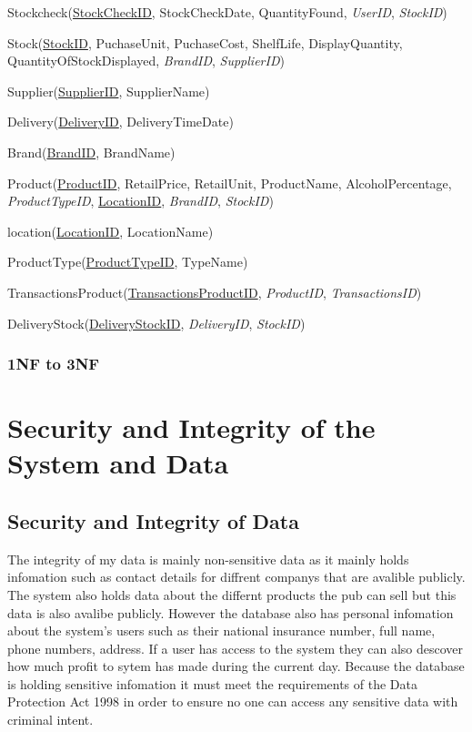 Stockcheck(\underline{StockCheckID}, StockCheckDate, QuantityFound, \emph{UserID}, \emph{StockID})

Stock(\underline{StockID}, PuchaseUnit, PuchaseCost, ShelfLife, DisplayQuantity, QuantityOfStockDisplayed, \emph{BrandID}, \emph{SupplierID})

Supplier(\underline{SupplierID}, SupplierName)

Delivery(\underline{DeliveryID}, DeliveryTimeDate)

Brand(\underline{BrandID}, BrandName)

Product(\underline{ProductID}, RetailPrice, RetailUnit, ProductName, AlcoholPercentage, \emph{ProductTypeID}, \underline{LocationID}, \emph{BrandID}, \emph{StockID})

location(\underline{LocationID}, LocationName)

ProductType(\underline{ProductTypeID}, TypeName)

TransactionsProduct(\underline{TransactionsProductID}, \emph{ProductID}, \emph{TransactionsID})

DeliveryStock(\underline{DeliveryStockID}, \emph{DeliveryID}, \emph{StockID})

\subsubsection{1NF to 3NF}

\section{Security and Integrity of the System and Data}

\subsection{Security and Integrity of Data}

The integrity of my data is mainly non-sensitive data as it mainly holds infomation such as contact details for diffrent companys that are avalible publicly. The system also holds data about the differnt products the pub can sell but this data is also avalibe publicly. However the database also has personal infomation about the system's users such as their national insurance number, full name, phone numbers, address. If a user has access to the system they can also descover how much profit to sytem has made during the current day. Because the database is holding sensitive infomation it must meet the requirements of the Data Protection Act 1998 in order to ensure no one can access any sensitive data with criminal intent. 

